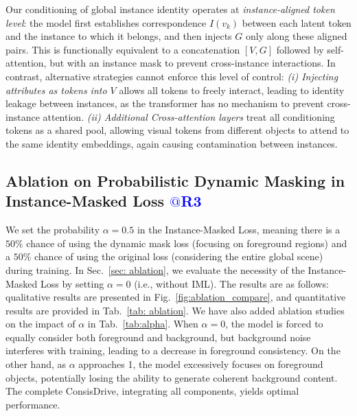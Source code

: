 Our conditioning of global instance identity operates at \emph{instance-aligned token level}:  
the model first establishes correspondence $I(v_k)$ between each latent token and the instance to which it belongs, and then injects $G$ only along these aligned pairs. 
This is functionally equivalent to a concatenation $[V, G]$ followed by self-attention, but with an instance mask to prevent cross-instance interactions.
In contrast, alternative strategies cannot enforce this level of control:
\textit{(i) Injecting attributes as tokens into $V$} allows all tokens to freely interact, leading to identity leakage between instances, as the transformer has no mechanism to prevent cross-instance attention.
\textit{(ii) Additional Cross-attention layers} treat all conditioning tokens as a shared pool, allowing visual tokens from different objects to attend to the same identity embeddings, again causing contamination between instances.






\subsection{Ablation on Probabilistic Dynamic Masking in Instance-Masked Loss \textcolor{blue}{$@$R3}}
We set the probability $\alpha=0.5$ in the Instance-Masked Loss, meaning there is a $50\%$ chance of using the dynamic mask loss (focusing on foreground regions) and a $50\%$ chance of using the original loss (considering the entire global scene) during training.
In Sec.~\ref{sec: ablation}, we evaluate the necessity of the Instance-Masked Loss by setting $\alpha = 0$ (i.e., without IML). The results are as follows: qualitative results are presented in Fig.~\ref{fig:ablation_compare}, and quantitative results are provided in Tab.~\ref{tab: ablation}.
We have also added ablation studies on the impact of $\alpha$ in Tab.~\ref{tab:alpha}.
When $\alpha = 0$, the model is forced to equally consider both foreground and background, but background noise interferes with training, leading to a decrease in foreground consistency. 
On the other hand, as $\alpha$ approaches 1, the model excessively focuses on foreground objects, potentially losing the ability to generate coherent background content.
The complete ConsisDrive, integrating all components, yields optimal performance.





